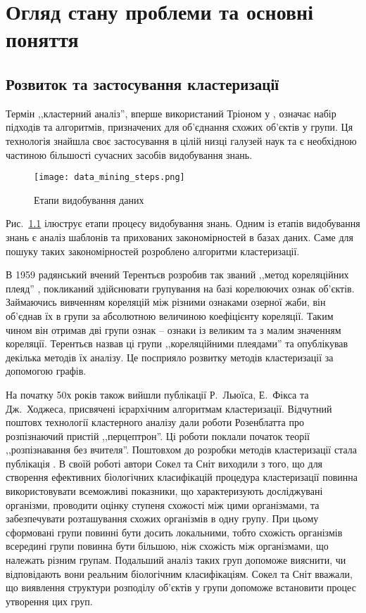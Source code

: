 \chapter{Огляд стану проблеми та основні поняття}\label{ch:01}

\section{Розвиток та застосування кластеризації}
    Термін ,,кластерний аналіз'', вперше використаний Тріоном у \cite{Tryon:Cluster:1939}, означає набір підходів та алгоритмів, призначених для об'єднання схожих об'єктів у групи. Ця технологія знайшла своє застосування в цілій низці галузей наук та є необхідною частиною більшості сучасних засобів видобування знань.
   
    \begin{figure}
        \centering
        \texttt{[image: data\_mining\_steps.png]}
        \caption{Етапи видобування даних}\label{fig:data_mining_steps}
    \end{figure}
    
    Рис.~\ref{fig:data_mining_steps} ілюструє етапи процесу видобування знань. Одним із етапів видобування знань є аналіз шаблонів та прихованих закономірностей в базах даних. Саме для пошуку таких закономірностей розроблено алгоритми кластеризації.
 
    В 1959 радянський вчений Терентьєв розробив так званий ,,метод кореляційних плеяд'' \cite{Terentyev}, покликаний здійснювати групування на базі корелюючих ознак об'єктів. Займаючись вивченням кореляцій між різними ознаками озерної жаби, він об'єднав їх в групи за абсолютною величиною коефіцієнту кореляції. Таким чином він отримав дві групи ознак -- ознаки із великим та з малим значенням кореляції. Терентьєв назвав ці групи ,,кореляційними плеядами'' та опублікував декілька методів їх аналізу. Це посприяло розвитку методів кластеризації за допомогою графів.
    
    На початку 50х років також вийшли публікації Р.~Льюїса, Е.~Фікса та Дж.~Ходжеса, присвячені ієрархічним алгоритмам кластеризації. Відчутний поштовх технології кластерного аналізу дали роботи Розенблатта про розпізнаючий пристій ,,перцептрон''. Ці роботи поклали початок теорії ,,розпізнавання без вчителя''. Поштовхом до розробки методів кластеризації стала публікація \cite{SokalSneath}. В своїй роботі автори Сокел та Сніт виходили з того, що для створення ефективних біологічних класифікацій процедура кластеризації повинна використовувати всеможливі показники, що характеризують досліджувані організми, проводити оцінку ступеня схожості між цими організмами, та забезпечувати розташування схожих організмів в одну групу. При цьому сформовані групи повинні бути досить локальними, тобто схожість організмів всередині групи повинна бути більшою, ніж схожість між організмами, що належать різним групам. Подальший аналіз таких груп допоможе вияснити, чи відповідають вони реальним біологічним класифікаціям. Сокел та Сніт вважали, що виявлення структури розподілу об'єктів у групи допоможе встановити процес утворення цих груп.
    
